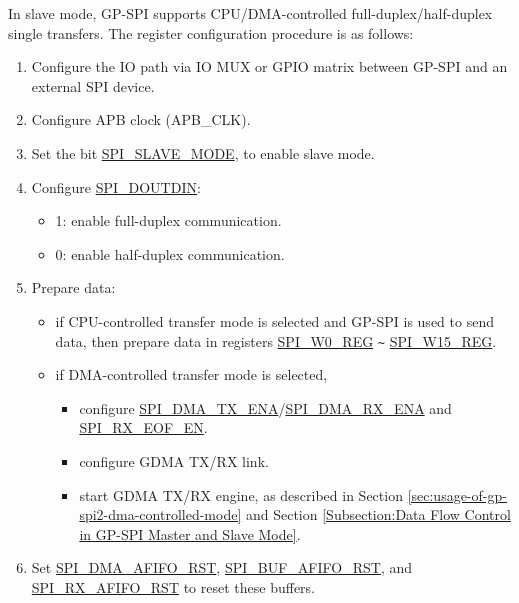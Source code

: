 \documentclass[main\_\_EN.tex]{subfiles}
\begin{document}
In slave mode, GP-SPI supports CPU/DMA-controlled full-duplex/half-duplex single transfers. The register configuration procedure is as follows:
\begin{enumerate}
    \item Configure the IO path via IO MUX or GPIO matrix between GP-SPI and an external SPI device.

    \item Configure APB clock (APB\_CLK).

    \item Set the bit \hyperref[fielddesc:SPISLAVEMODE]{SPI\_SLAVE\_MODE}, to enable slave mode.

    \item Configure \hyperref[fielddesc:SPIDOUTDIN]{SPI\_DOUTDIN}:
    \begin{itemize}
        \item 1: enable full-duplex communication.
        \item 0: enable half-duplex communication.
    \end{itemize}

    \item Prepare data:
    \begin{itemize}
        \item if CPU-controlled transfer mode is selected and GP-SPI is used to send data, then prepare data in registers \hyperref[regdesc:SPIW0REG]{SPI\_W0\_REG} \verb+~+ \hyperref[regdesc:SPIW15REG]{SPI\_W15\_REG}.
        \item if DMA-controlled transfer mode is selected,
        \begin{itemize}
            \item configure \hyperref[fielddesc:SPIDMATXENA]{SPI\_DMA\_TX\_ENA}/\hyperref[fielddesc:SPIDMARXENA]{SPI\_DMA\_RX\_ENA} and \hyperref[fielddesc:SPIRXEOFEN]{SPI\_RX\_EOF\_EN}.
            \item configure GDMA TX/RX link.
            \item start GDMA TX/RX engine, as described in Section \ref{sec:usage-of-gp-spi2-dma-controlled-mode} and Section \ref{Subsection:Data Flow Control in GP-SPI Master and Slave Mode}.
        \end{itemize}
    \end{itemize}

    \item Set \hyperref[fielddesc:SPIDMAAFIFORST]{SPI\_DMA\_AFIFO\_RST}, \hyperref[fielddesc:SPIBUFAFIFORST]{SPI\_BUF\_AFIFO\_RST}, and \hyperref[fielddesc:SPIRXAFIFORST]{SPI\_RX\_AFIFO\_RST} to reset these buffers.


\end{enumerate}
\end{document}
